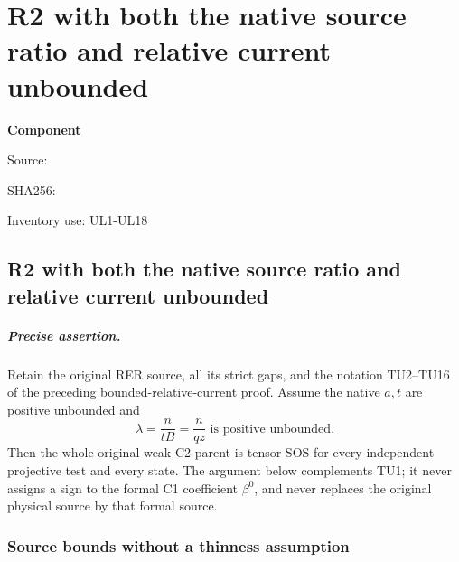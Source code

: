 \chapter{R2 with both the native source ratio and relative current unbounded}
\label{component:pef021eabacde}
\noindent\textbf{Component }\par
{\small\noindent Source: \par}
{\small\noindent SHA256: \par}
{\small\noindent Inventory use: UL1-UL18\par}
\medskip
\section{R2 with both the native source ratio and relative current unbounded}
\label{pef021eabacde:sec:r2-unbounded-current-new}

\paragraph{Precise assertion.}
Retain the original RER source, all its strict gaps, and the notation
TU2--TU16 of the preceding bounded-relative-current proof.
Assume the native $a,t$ are positive unbounded and
\[
             \lambda=\frac{n}{tB}=\frac{n}{qz}
                   \text{ is positive unbounded}.                 \tag{UL1}
\]
Then the whole original weak-C2 parent is tensor SOS for every
independent projective test and every state. The argument below
complements TU1; it never assigns a sign to the formal C1 coefficient
$\beta^0$, and never replaces the original physical source by that
formal source.

\subsection{Source bounds without a thinness assumption}

